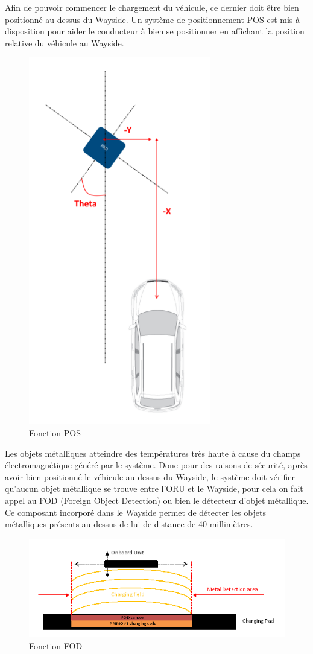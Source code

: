 Afin de pouvoir commencer le chargement du véhicule, ce dernier doit être bien positionné au-dessus du Wayside. Un système de positionnement POS est mis à disposition pour aider le conducteur à bien se positionner en affichant la position relative du véhicule au Wayside.

\begin{figure}[H]
 \centering
 \includegraphics[scale=0.7]{images/pos}
 \caption{Fonction POS}
\end{figure}

Les objets métalliques atteindre des températures très haute à cause du champs électromagnétique généré par le système. Donc pour des raisons de sécurité, après avoir bien positionné le véhicule au-dessus du Wayside, le système doit vérifier qu’aucun objet métallique se trouve entre l’ORU et le Wayside, pour cela on fait appel au FOD (Foreign Object Detection) ou bien le détecteur d’objet métallique. Ce composant incorporé dans le Wayside permet de détecter les objets métalliques présents au-dessus de lui de distance de 40 millimètres.

\begin{figure}[H]
 \centering
 \includegraphics[scale=1]{images/fod_awc}
 \caption{Fonction FOD}
\end{figure}

